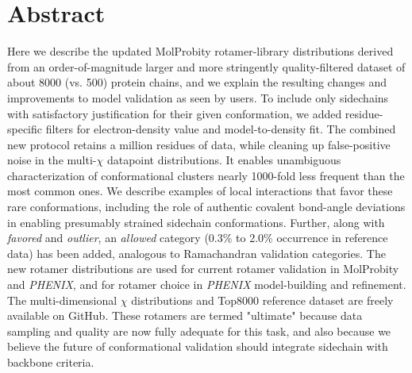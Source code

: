 \section{Abstract}

Here we describe the updated MolProbity rotamer-library distributions derived from an order-of-magnitude larger and more stringently quality-filtered dataset of about 8000 (vs. 500) protein chains, and we explain the resulting changes and improvements to model validation as seen by users. To include only sidechains with satisfactory justification for their given conformation, we added residue-specific filters for electron-density value and model-to-density fit.  The combined new protocol retains a million residues of data, while cleaning up \textcolor{changecolor}{false-positive} noise in the multi-$\chi$ \textcolor{changecolor}{datapoint} distributions.  It enables \textcolor{changecolor}{unambiguous} characterization of conformational clusters nearly 1000-fold less frequent than the most common ones.  We describe examples of local interactions that favor these rare conformations, including the role of authentic covalent bond-angle deviations in enabling presumably strained sidechain conformations. Further, along with \textit{favored} and \textit{outlier}, an \textit{allowed} category (0.3\% to 2.0\% occurrence in reference data) has been added, analogous to Ramachandran validation categories. The new rotamer distributions are used for current rotamer validation in MolProbity and \textit{PHENIX}, and for rotamer choice in \textit{PHENIX} model-building and refinement. The multi-dimensional $\chi$ distributions and Top8000 reference dataset are freely available on GitHub. These rotamers are termed "ultimate" because data sampling and quality are now fully adequate for this task, and also because we believe the future of conformational validation should integrate sidechain \textcolor{changecolor}{with} backbone \textcolor{changecolor}{criteria}.

